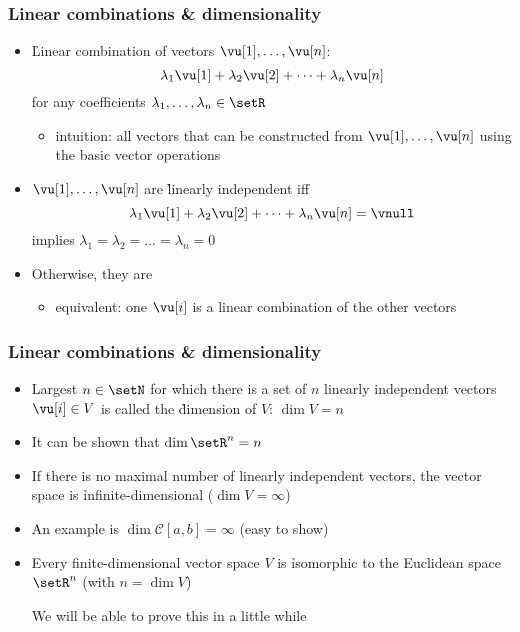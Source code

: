\begin{frame}
  \frametitle{Linear combinations \& dimensionality}

  \begin{itemize}
  \item \h{Linear combination} of vectors $\vu[1],\ldots, \vu[n]$:
    \[ \lambda_1 \vu[1] + \lambda_2 \vu[2] + \dots + \lambda_n \vu[n] \]
    for any coefficients $\lambda_1, \ldots, \lambda_n \in \setR$
    \begin{itemize}
    \item intuition: all vectors that can be constructed from $\vu[1],\ldots,
      \vu[n]$ using the basic vector operations
    \end{itemize}
    \pause\gap
  \item $\vu[1],\ldots, \vu[n]$ are \h{linearly independent} iff
    \[ 
    \lambda_1 \vu[1] + \lambda_2 \vu[2] + \dots + \lambda_n \vu[n] = \vnull 
    \]
    implies $\lambda_1 = \lambda_2 = \dots = \lambda_n = 0$%
    \pause\gap
  \item Otherwise, they are 
    \begin{itemize}
    \item equivalent: one $\vu[i]$ is a linear combination of the other vectors
    \end{itemize}
  \end{itemize}
\end{frame}

\begin{frame}
  \frametitle{Linear combinations \& dimensionality}

  \begin{itemize}
  \item Largest $n\in \setN$ for which there is a set of $n$
    linearly independent vectors $\vu[i]\in V$ is called the \h{dimension}
    of $V$: $\dim V = n$ 
  \item It can be shown that $\dim \setR^n = n$%
    \pause\gap
  \item If there is no maximal number of linearly independent vectors, the
    vector space is \h{infinite-dimensional} ($\dim V = \infty$)
  \item An example is $\dim \mathcal{C}[a,b] = \infty$ (easy to show)%
    \pause\gap
  \item Every finite-dimensional vector space $V$ is
    \h{isomorphic} to the Euclidean space $\setR^n$ (with $n = \dim V$)
    \begin{itemize}
      \itemhand We will be able to prove this in a little while
    \end{itemize}
  \end{itemize}
\end{frame}

